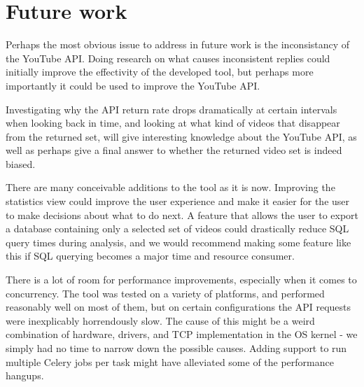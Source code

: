 \section{Future work}
Perhaps the most obvious issue to address in future work is the inconsistancy
of the YouTube API. Doing research on what causes inconsistent replies could
initially improve the effectivity of the developed tool, but perhaps more 
importantly it could be used to improve the YouTube API. 

Investigating why the API return rate drops dramatically at certain intervals
when looking back in time, and looking at what kind of videos that disappear
from the returned set, will give interesting knowledge about the YouTube API,
as well as perhaps give a final answer to whether the returned video set is
indeed biased.

There are many conceivable additions to the tool as it is now. Improving the
statistics view could improve the user experience and make it easier for the
user to make decisions about what to do next. A feature that allows the user to
export a database containing only a selected set of videos could drastically
reduce SQL query times during analysis, and we would recommend making some
feature like this if SQL querying becomes a major time and resource consumer.

There is a lot of room for performance improvements, especially when it comes to
concurrency. The tool was tested on a variety of platforms, and performed
reasonably well on most of them, but on certain configurations the API requests
were inexplicably horrendously slow. The cause of this might be a weird
combination of hardware, drivers, and TCP implementation in the OS kernel - 
we simply had no time to narrow down the possible causes. Adding support to run
multiple Celery jobs per task might have alleviated some of the performance
hangups.

